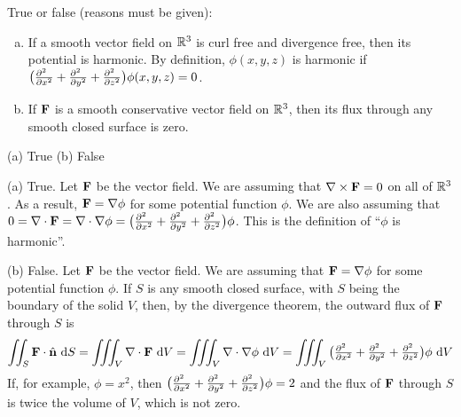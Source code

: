 \begin{question}[M317 2004A] %
  True or false (reasons must be given):
\begin{enumerate}[(a)]
\item 
If a smooth vector field on $\mathbb{R}^3$ is curl free and divergence
free, then its potential is harmonic. By definition, $\phi(x,y,z)$
is harmonic if $\big(\frac{\partial^2\hfill}{\partial x^2}
                           +\frac{\partial^2\hfill}{\partial y^2}
                           +\frac{\partial^2\hfill}{\partial z^2}\big)
                           \phi(x,y,z)=0$.

\item
If $\mathbf{F}$ is a smooth conservative vector field on $\mathbb{R}^3$,
then its flux through any smooth closed surface is zero.
\end{enumerate}
\end{question}


\begin{answer} 
(a) True\qquad
(b) False
\end{answer}

\begin{solution} 
(a) True. 
Let $\mathbf{F}$ be the vector field. We are assuming
that $\nabla\times\mathbf{F}=0$ on all of $\mathbb{R}^3$. As a result, $\mathbf{F}=\nabla\phi$
for some potential function $\phi$. We are also assuming that $0=\nabla\cdot\vF
=\nabla\cdot\nabla\phi =\big(\frac{\partial^2\hfill}{\partial x^2}
+\frac{\partial^2\hfill}{\partial y^2}
+\frac{\partial^2\hfill}{\partial z^2}\big)\phi$. This is the definition
of ``$\phi$ is harmonic''.

(b) False. 
Let $\mathbf{F}$ be the vector field. We are assuming
that  $\mathbf{F}=\nabla\phi$ for some potential function $\phi$. If $S$ is any
smooth closed surface, with $S$ being the boundary of the solid $V$, then,
by the divergence theorem, the outward flux of $\mathbf{F}$ through $S$ is
\begin{equation*}
\dblInt_S \vF\cdot\hn\ \dee{S}
=\tripInt_V \nabla\cdot\vF\ \dee{V}
=\tripInt_V \nabla\cdot\nabla \phi\ \dee{V}
=\tripInt_V \big(\tfrac{\partial^2\hfill}{\partial x^2}
+\tfrac{\partial^2\hfill}{\partial y^2}
+\tfrac{\partial^2\hfill}{\partial z^2}\big)\phi\ \dee{V}
\end{equation*}
If, for example, $\phi=x^2$, then  
$\big(\frac{\partial^2\hfill}{\partial x^2}
+\frac{\partial^2\hfill}{\partial y^2}
+\frac{\partial^2\hfill}{\partial z^2}\big)\phi=2$ and the flux of $\mathbf{F}$
through $S$ is twice the volume of $V$, which is not zero.
\end{solution}

